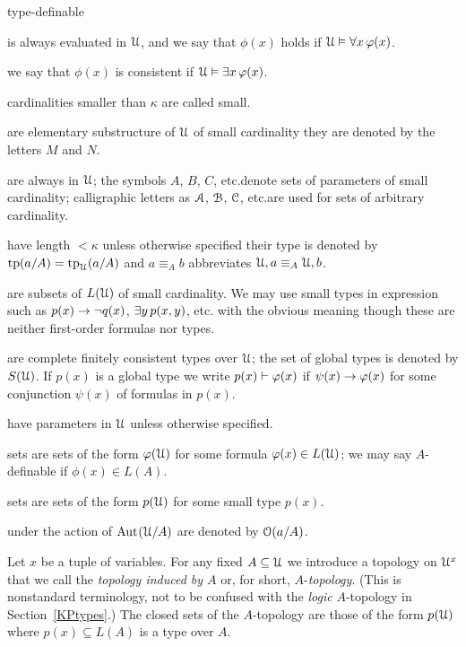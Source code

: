 \begin{litemize}{type-definable}
\item[\emph{truth}] is always evaluated in $\EuScript U$, and we say that $\phi(x)$ holds if $\EuScript U\vDash\forall x\,\varphi(x)$.
\item[\emph{consistency}] we say that $\phi(x)$ is consistent if $\EuScript U\vDash\exists x\,\varphi(x)$.
\item[\emph{small/large}] cardinalities smaller than $\kappa$ are called small. 
\item[\emph{models}] are elementary substructure of $\EuScript U$ of small cardinality they are denoted by the letters $M$ and $N$.
\item[\emph{parameters}] are always in $\EuScript U$; the symbols $A$, $B$, $C$, etc.\@ denote sets of parameters of small cardinality; calligraphic letters as $\EuScript A$, $\EuScript B$, $\EuScript C$, etc.\@ are used for sets of arbitrary cardinality.
\item[\emph{tuples}] have length $<\kappa$ unless otherwise specified their type is denoted by ${\rm tp}(a/A)={\rm tp}_\EuScript U(a/A)$ and $a\equiv_A b$ abbreviates $\EuScript U,a \equiv_A \EuScript U,b$.
\item[\emph{small types}] are subsets of $L(\EuScript U)$ of small cardinality.
We may use small types in expression such as $p(x)\rightarrow\neg q(x)$, $\exists y\,p(x,y)$, etc. with the obvious meaning though these are neither first-order formulas nor types.
\item[\emph{global types}] are complete finitely consistent types over $\EuScript U$; the set of global types is denoted by $S(\EuScript U)$. If $p(x)$ is a global type we write $p(x)\vdash\varphi(x)$ if $\psi(x)\rightarrow\varphi(x)$ for some conjunction $\psi(x)$ of formulas in $p(x)$.
\item[\emph{formulas}] have parameters in $\EuScript U$ unless otherwise specified.
\item[\emph{definable}] sets are sets of the form $\varphi(\EuScript U)$ for some formula $\varphi(x)\in L(\EuScript U)$; we may say $A$-definable if $\phi(x)\in L(A)$.
\item[\emph{type-definable}] sets are sets of the form $p(\EuScript U)$ for some small type $p(x)$.
\item[\emph{orbits of tuples}] under the action of ${\rm Aut\kern.15ex}(\EuScript U/A)$ are denoted by $\EuScript O(a/A)$.
\end{litemize}

Let $x$ be a tuple of variables. For any fixed $A\subseteq \EuScript U$ we introduce a topology on $\EuScript U^{x}$ that we call the \emph{topology induced by $A$} or, for short, \emph{$A\mbox{-}$topology}. 
(This is nonstandard terminology, not to be confused with the \textit{logic\/} $A\mbox{-}$topology in Section~\ref{KPtypes}.)
The closed sets of the $A\mbox{-}$topology are those of the form $p(\EuScript U)$ where $p(x)\subseteq L(A)$ is a type over $A$.

